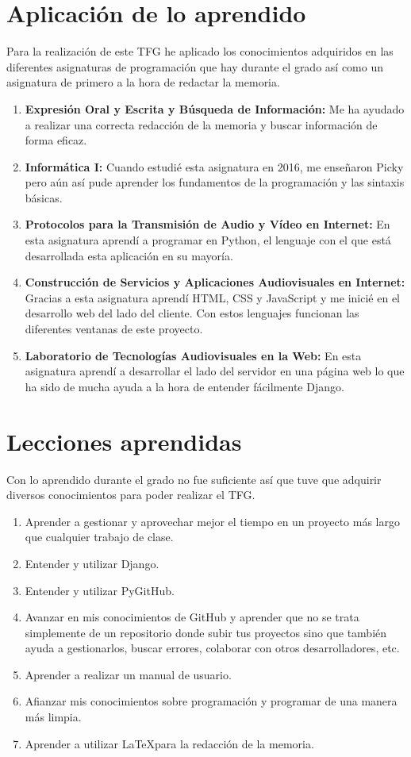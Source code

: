\documentclass[a4paper, 12pt]{book}
\begin{document}
\section{Aplicación de lo aprendido}
\label{sec:aplicacion}
Para la realización de este TFG he aplicado los conocimientos adquiridos en las diferentes asignaturas de programación que hay durante el grado así como un asignatura de primero a la hora de redactar la memoria.
\begin{enumerate}
  \item \textbf{Expresión Oral y Escrita y Búsqueda de Información:} Me ha ayudado a realizar una correcta redacción de la memoria y buscar información de forma eficaz.
  \item \textbf{Informática I:} Cuando estudié esta asignatura en 2016, me enseñaron Picky pero aún así pude aprender los fundamentos de la programación y las sintaxis básicas.
  \item \textbf{Protocolos para la Transmisión de Audio y Vídeo en Internet:} En esta asignatura aprendí a programar en Python, el lenguaje con el que está desarrollada esta aplicación en su mayoría.
  \item \textbf{Construcción de Servicios y Aplicaciones Audiovisuales en Internet:} Gracias a esta asignatura aprendí HTML, CSS y JavaScript y me inicié en el desarrollo web del lado del cliente. Con estos lenguajes funcionan las diferentes ventanas de este proyecto.
  \item \textbf{Laboratorio de Tecnologías Audiovisuales en la Web:} En esta asignatura aprendí a desarrollar el lado del servidor en una página web lo que ha sido de mucha ayuda a la hora de entender fácilmente Django.
\end{enumerate}
\section{Lecciones aprendidas}
\label{sec:lecciones_aprendidas}
Con lo aprendido durante el grado no fue suficiente así que tuve que adquirir diversos conocimientos para poder realizar el TFG.
\begin{enumerate}
  \item Aprender a gestionar y aprovechar mejor el tiempo en un proyecto más largo que cualquier trabajo de clase.
  \item Entender y utilizar Django.
  \item Entender y utilizar PyGitHub.
  \item Avanzar en mis conocimientos de GitHub y aprender que no se trata simplemente de un repositorio donde subir tus proyectos sino que también ayuda a gestionarlos, buscar errores, colaborar con otros desarrolladores, etc.
  \item Aprender a realizar un manual de usuario.
  \item Afianzar mis conocimientos sobre programación y programar de una manera más limpia.
  \item Aprender a utilizar \LaTeX  para la redacción de la memoria.
\end{enumerate}
\end{document}
